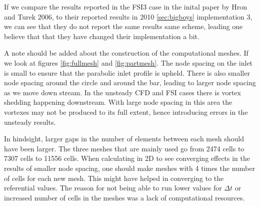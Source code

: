 If we compare the results reported in the FSI3 case in the inital paper by Hron and Turek 2006, to their reported results in 2010 \ref{sec:bigboys} implementation 3, we can see that they do not report the same results same scheme, leading one believe that that they have changed their implementation a bit. 

A note should be added about the construction of the computational meshes. If we look at figures \ref{fig:fullmesh} and \ref{fig:partmesh}. The node spacing on the inlet is small to ensure that the parabolic inlet profile is upheld. There is also smaller node spacing around the circle and around the bar, leading to larger node spacing as we move down stream. In the unsteady CFD and FSI cases there is vortex shedding happening downstream. With large node spacing in this area the vortexes may not be produced to its full extent, hence introducing errors in the unsteady results. 

In hindsight, larger gaps in the number of elements between each mesh should have been larger. The three meshes that are mainly used go from 2474 cells to 7307 cells to 11556 cells. When calculating in 2D to see converging effects in the results of smaller node spacing, one should make meshes with 4 times the number of cells for each new mesh. This might have helped in converging to the referential values. The reason for not being able to run lower values for $\Delta t$ or increased number of cells in the meshes was a lack of computational resources.

